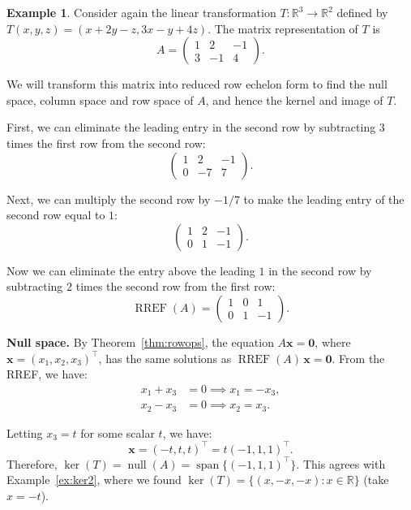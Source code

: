 \documentclass[11pt]{article}
\theoremstyle{definition}
\newtheorem{example}[definition]{Example}
\theoremstyle{plain}
\theoremstyle{remark}
\DeclareMathOperator{\Null}{null}
\DeclareMathOperator{\Span}{span}
\DeclareMathOperator{\RREF}{RREF}
\begin{document}
\begin{example}\label{ex:worked}
    Consider again the linear transformation $T: \mathbb{R}^3 \to \mathbb{R}^2$ defined by $T(x, y, z) = (x + 2y - z, 3x - y + 4z)$. The matrix representation of $T$ is
    \[A = \begin{pmatrix}
        1 & 2 & -1 \\
        3 & -1 & 4
    \end{pmatrix}.\]

    We will transform this matrix into reduced row echelon form to find the null space, column space and row space of $A$, and hence the kernel and image of $T$.

    First, we can eliminate the leading entry in the second row by subtracting $3$ times the first row from the second row:
    \[\begin{pmatrix}
        1 & 2 & -1 \\
        0 & -7 & 7
    \end{pmatrix}.\]

    Next, we can multiply the second row by $-1/7$ to make the leading entry of the second row equal to $1$:
    \[\begin{pmatrix}
        1 & 2 & -1 \\
        0 & 1 & -1
    \end{pmatrix}.\]

    Now we can eliminate the entry above the leading $1$ in the second row by subtracting $2$ times the second row from the first row:
    \[\RREF(A) = \begin{pmatrix}
        1 & 0 & 1 \\
        0 & 1 & -1
    \end{pmatrix}.\]

    \textbf{Null space.} By Theorem~\ref{thm:rowops}, the equation $A\mathbf{x} = \mathbf{0}$, where $\mathbf{x} = (x_1, x_2, x_3)^\top$, has the same solutions as $\RREF(A)\,\mathbf{x} = \mathbf{0}$. From the RREF, we have:
    \begin{align*}
        x_1 + x_3 &= 0 \implies x_1 = -x_3, \\
        x_2 - x_3 &= 0 \implies x_2 = x_3.
    \end{align*}

    Letting $x_3 = t$ for some scalar $t$, we have:
    \[\mathbf{x} = (-t, t, t)^\top = t(-1, 1, 1)^\top.\]
    Therefore, $\ker(T) = \Null(A) = \Span\{(-1, 1, 1)^\top\}$. This agrees with Example~\ref{ex:ker2}, where we found $\ker(T) = \{(x, -x, -x) : x \in \mathbb{R}\}$ (take $x = -t$).


\end{example}
\end{document}
